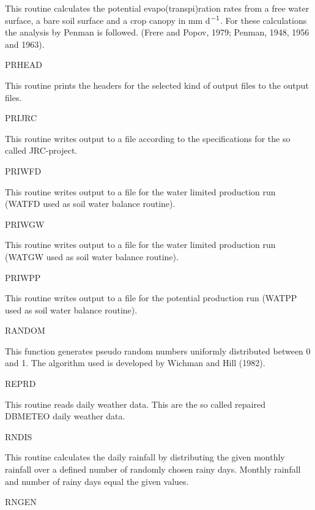 \documentclass[11pt]{article}
\begin{document}
\begin{indenting}{2.54cm}
This routine calculates the potential evapo(transpi)ration rates from a free
water surface, a bare soil surface and a crop canopy in mm d$^{{\rm -1}}$. For these
calculations the analysis by Penman is followed. (Frere and Popov, 1979;
Penman, 1948, 1956 and 1963).
\end{indenting}
PRHEAD
\testlastline

\begin{indenting}{2.54cm}
This routine prints the headers for the selected kind of output files to the
output files.
\end{indenting}
PRIJRC
\testlastline

\begin{indenting}{2.54cm}
This routine writes output to a file according to the specifications for the so
called JRC-project.
\end{indenting}
PRIWFD
\testlastline

\begin{indenting}{2.54cm}
This routine writes output to a file for the water limited production run
(WATFD used as soil water balance routine).
\end{indenting}
PRIWGW
\testlastline

\begin{indenting}{2.54cm}
This routine writes output to a file for the water limited production run
(WATGW used as soil water balance routine).
\end{indenting}
PRIWPP
\testlastline

\begin{indenting}{2.54cm}
This routine writes output to a file for the potential production run (WA\-TPP used as soil water balance routine).
\end{indenting}
RANDOM
\testlastline

\begin{indenting}{2.54cm}
This function generates pseudo random numbers uniformly distributed
between 0 and 1. The algorithm used is developed by Wichman and Hill
(1982).
\end{indenting}
REPRD
\testlastline

\begin{indenting}{2.54cm}
This routine reads daily weather data. This are the so called repaired
DBMETEO daily weather data.
\end{indenting}
RNDIS
\testlastline

\begin{indenting}{2.54cm}
This routine calculates the daily rainfall by distributing the given monthly
rainfall over a defined number of randomly chosen rainy days. Monthly
rainfall and number of rainy days equal the given values. 
\end{indenting}
RNGEN
\testlastline
\end{document}
